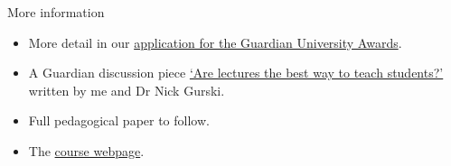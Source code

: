 \documentclass[12pt,envcountsect]{beamer}
\theoremstyle{plain}
\theoremstyle{definition}
\begin{document}
\begin{frame}{More information}
\begin{itemize}
\item More detail in our \href{http://sam-marsh.staff.shef.ac.uk/docs/guardian_award_application.pdf}{application for the Guardian University Awards}.
\item A Guardian discussion piece \href{http://www.theguardian.com/higher-education-network/2015/mar/31/are-lectures-the-best-way-to-teach-students}{`Are lectures the best way to teach students?'} written by me and Dr Nick Gurski.
\item Full pedagogical paper to follow.
\item The \href{http://sam-marsh.staff.shef.ac.uk/mas140_151_152?staff_view=1}{course webpage}.
\end{itemize}

\end{frame}
\end{document}
